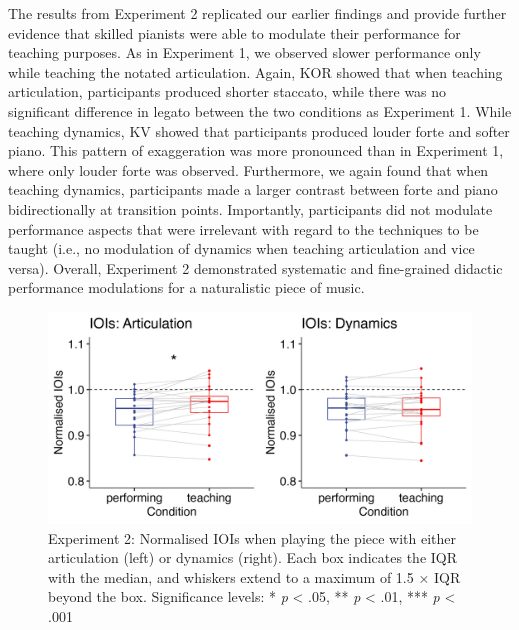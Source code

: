 \documentclass[
  english,
  man,floatsintext]{apa6}
\begin{document}
The results from Experiment 2 replicated our earlier findings and provide further evidence that skilled pianists were able to modulate their performance for teaching purposes. As in Experiment 1, we observed slower performance only while teaching the notated articulation. Again, KOR showed that when teaching articulation, participants produced shorter staccato, while there was no significant difference in legato between the two conditions as Experiment 1. While teaching dynamics, KV showed that participants produced louder forte and softer piano. This pattern of exaggeration was more pronounced than in Experiment 1, where only louder forte was observed. Furthermore, we again found that when teaching dynamics, participants made a larger contrast between forte and piano bidirectionally at transition points. Importantly, participants did not modulate performance aspects that were irrelevant with regard to the techniques to be taught (i.e., no modulation of dynamics when teaching articulation and vice versa). Overall, Experiment 2 demonstrated systematic and fine-grained didactic performance modulations for a naturalistic piece of music.

\begin{figure}
\includegraphics[width=1\linewidth]{manuscript_files/figure-latex/plot-ioi-2-1} \caption{\label{fig:ioi-2}Experiment 2: Normalised IOIs when playing the piece with either articulation (left) or dynamics (right). Each box indicates the IQR with the median, and whiskers extend to a maximum of 1.5 × IQR beyond the box. Significance levels: * \textit{p} < .05, ** \textit{p} < .01, *** \textit{p} < .001}\label{fig:plot-ioi-2}
\end{figure}
\end{document}
